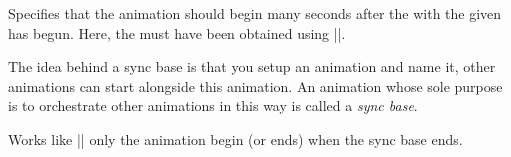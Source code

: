 \begin{command}{\pgfsysanimkeysyncbegin{}}
\end{command}
\begin{command}{\pgfsys@animation@syncbegin{}}
    Specifies that the animation should begin  many seconds
    after the  with the given  has begun. Here,
    the  must have been obtained using |\pgfsys@new@id|.

    The idea behind a sync base is that you setup an animation and name it,
    other animations can start alongside this animation. An animation whose
    sole purpose is to orchestrate other animations in this way is called a
    \emph{sync base}.
\end{command}

\begin{command}{\pgfsysanimkeysyncend{}}
\end{command}
\begin{command}{\pgfsys@animation@syncend{}}
    Works like |\pgfsysanimkeysyncbegin| only the animation begin (or ends)
    when the sync base ends.
\end{command}

